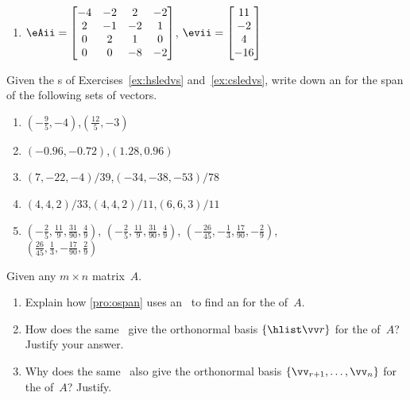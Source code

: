 \begin{exercise}
\begin{enumerate}
\item \(\eAii=\begin{bmatrix} -4&-2&2&-2
\\2&-1&-2&1
\\0&2&1&0
\\0&0&-8&-2 \end{bmatrix}\),
\(\evii=\begin{bmatrix} 11
\\-2
\\4
\\-16 \end{bmatrix}\)

\end{enumerate}
\end{exercise}




\begin{exercise} \label{ex:} 
Given the \svd{}s of Exercises~\ref{ex:hsledvs} and~\ref{ex:csledvs}, write down an  for the span of the following sets of vectors.
\begin{enumerate}
\item \((-\frac{9}{5},-4)\),\quad \((\frac{12}{5},-3)\)
\answer{\iv, \jv}

\item \((-0.96,-0.72)\),\quad \((1.28,0.96)\)

\item \((7,-22,-4)/39\),\quad \((-34,-38,-53)/78\)

\item \((4,4,2)/33\),\quad \((4,4,2)/11\),\quad \((6,6,3)/11\)

\item \((-\frac{2}{5},\frac{11}{9},\frac{31}{90},\frac{4}{9})\),\quad
\((-\frac{2}{5},\frac{11}{9},\frac{31}{90},\frac{4}{9})\),\quad
\((-\frac{26}{45},-\frac{1}{3},\frac{17}{90},-\frac{2}{9})\), \\
\((\frac{26}{45},\frac{1}{3},-\frac{17}{90},\frac{2}{9})\)

\end{enumerate}
\end{exercise}





\begin{exercise} \label{ex:ospanrcn} 
Given any \(m\times n\) matrix~\(A\).
\begin{enumerate}
\item Explain how \autoref{pro:ospan} uses an \svd\ to find an  for the  of~\(A\).
\item How does the same \svd\ give the orthonormal basis \(\{\hlist\vv r\}\) for the  of~\(A\)?  Justify your answer.
\item Why does the same \svd\ also give the orthonormal basis \(\{\vv_{r+1},\ldots,\vv_n\}\) for the  of~\(A\)?  Justify.
\end{enumerate}
\end{exercise}




